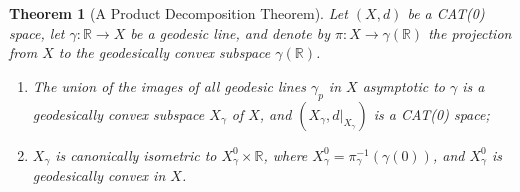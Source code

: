 \documentclass[11pt, a4paper, oneside]{memoir}
\theoremstyle{plain}\newtheorem{theorem}[subsection]{Theorem}
\theoremstyle{definition}
\newcommand{\parenum}{\setenumerate[1]{label=\textbf{(\arabic*)}}}
\newcommand{\R}{\mathbb{R}}
\begin{document}
\begin{theorem}[A Product Decomposition Theorem]
    Let \((X,d)\) be a CAT(0) space, let \(\gamma:\R\to X\) be a geodesic line, and denote by \(\pi:X\to \gamma(\R)\) the projection from \(X\) to the geodesically convex subspace \(\gamma(\R)\).
\parenum
\begin{enumerate}
    \item The union of the images of all geodesic lines \(\gamma_p\) in \(X\) asymptotic to \(\gamma\) is a geodesically convex subspace \(X_\gamma\) of \(X\), and \(\left(X_\gamma,d|_{X_\gamma}\right)\) is a CAT(0) space;
    \item \(X_\gamma\) is canonically isometric to \(X_\gamma^0\times \R\), where \(X_\gamma^0=\pi_\gamma^{-1}(\gamma(0))\), and \(X_\gamma^0\) is geodesically convex in \(X\).
\end{enumerate}
\end{theorem}
\end{document}
